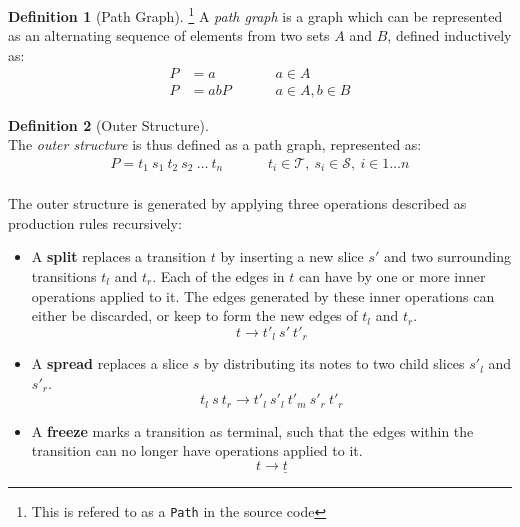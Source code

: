 \documentclass[12pt,a4paper,twoside,openright]{report}
\theoremstyle{definition}
\newtheorem{definition}{Definition}[section]
\begin{document}
\begin{definition}[Path Graph] \footnote{This is refered to as a \texttt{Path} in the source code} A \textit{path graph} is a graph which can be represented as an alternating sequence of elements from two sets $A$ and $B$, defined inductively as:
  \begin{equation}
    \begin{align}
      P &= a     &&&& a \in A \\
      P &= abP   &&&& a \in A, b \in B 
    \end{align}
    \label{eq:biPath}
  \end{equation}
\end{definition}

\begin{definition}[Outer Structure] ~\\The \textit{outer structure} is thus defined as a path graph, represented as:
\begin{equation}
    \begin{align}
      P = t_1~s_1~t_2~s_2~\dots~t_n     &&&& t_i \in \mathcal{T},~s_i \in \mathcal{S},~ i \in 1\dots n \\
    \end{align}
  \label{eq:outerStructureDef}
\end{equation}
\end{definition}

The outer structure is generated by applying three operations described as production rules recursively:

\begin{itemize}
  \item A \textbf{split} replaces a transition $t$ by inserting a new slice $s'$ and two surrounding transitions $t_l$ and $t_r$. Each of the edges in $t$ can have by one or more inner operations applied to it. The edges generated by these inner operations can either be discarded, or keep to form the new edges of $t_l$ and $t_r$.
\begin{equation}
  t \to t'_l~s'~t'_r
  \label{eq:splitrule}
\end{equation}
  \item A \textbf{spread} replaces a slice $s$ by distributing its notes to two child slices $s'_l$ and $s'_r$. 
\begin{equation}
  t_l~s~t_r \to t'_l~s'_l~t'_m~s'_r~t'_r
  \label{eq:spreadrule}
\end{equation}
\item A \textbf{freeze} marks a transition as terminal, such that the edges within the transition can no longer have operations applied to it. 
\begin{equation}
  t \to \underline{t}
  \label{eq:freezerule}
\end{equation}
\end{itemize}
\end{document}
